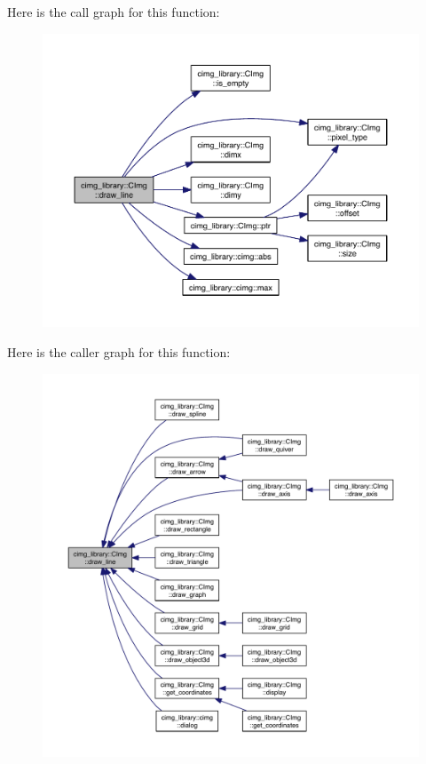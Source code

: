 Here is the call graph for this function\-:
\nopagebreak
\begin{figure}[H]
\begin{center}
\leavevmode
\includegraphics[width=350pt]{structcimg__library_1_1_c_img_a1fe7b3d3438708eecd0978ee7df2db1b_cgraph}
\end{center}
\end{figure}




Here is the caller graph for this function\-:
\nopagebreak
\begin{figure}[H]
\begin{center}
\leavevmode
\includegraphics[width=350pt]{structcimg__library_1_1_c_img_a1fe7b3d3438708eecd0978ee7df2db1b_icgraph}
\end{center}
\end{figure}


